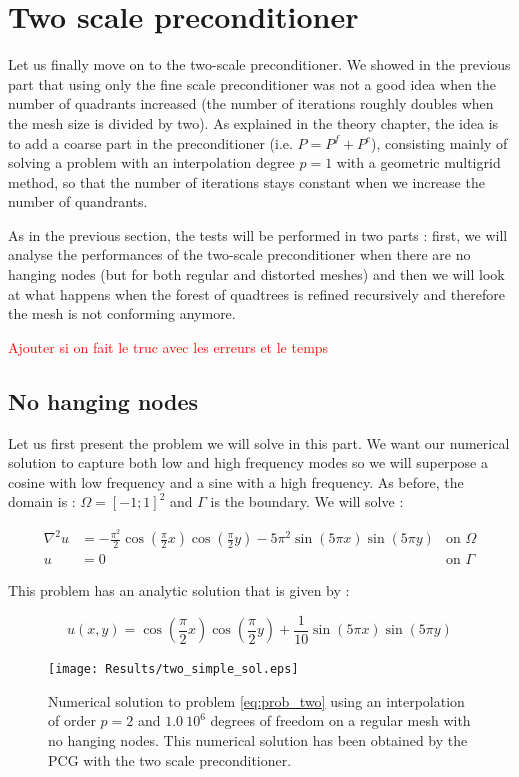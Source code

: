 \section{Two scale preconditioner}

Let us finally move on to the two-scale preconditioner. We showed in the previous part that using only the fine scale preconditioner was not a good idea when the number of quadrants increased (the number of iterations roughly doubles when the mesh size is divided by two). As explained in the theory chapter, the idea is to add a coarse part in the preconditioner (i.e. $P = P^f + P^c$), consisting mainly of solving a problem with an interpolation degree $p=1$ with a geometric multigrid method, so that the number of iterations stays constant when we increase the number of quandrants.  

As in the previous section, the tests will be performed in two parts : first, we will analyse the performances of the two-scale preconditioner when there are no hanging nodes (but for both regular and distorted meshes) and then we will look at what happens when the forest of quadtrees is refined recursively and therefore the mesh is not conforming anymore. 

\textcolor{red}{Ajouter si on fait le truc avec les erreurs et le temps}

\subsection{No hanging nodes}

Let us first present the problem we will solve in this part. We want our numerical solution to capture both low and high frequency modes so we will superpose a cosine with low frequency and a sine with a high frequency. As before, the domain is : $\Omega = \left[ -1;1 \right]^2$ and $\Gamma$ is the boundary. We will solve : 

\begin{align}
\nabla^2 u &= -\frac{\pi^2}{2}\cos(\frac{\pi}{2}x)\cos(\frac{\pi}{2}y) - 5\pi^2\sin(5\pi x)\sin(5\pi y) &\text{on $\Omega$} \label{eq:prob_two}\\
u &= 0  &\text{on $\Gamma$}
\end{align}

This problem has an analytic solution that is given by : 

$$ u(x,y) = \cos(\frac{\pi}{2}x)\cos(\frac{\pi}{2}y) + \frac{1}{10}\sin(5\pi x)\sin(5\pi y)$$

\begin{figure}
\centering
\texttt{[image: Results/two\_simple\_sol.eps]}
\caption{Numerical solution to problem \ref{eq:prob_two} using an interpolation of order $p=2$ and $1.0\:10^{6}$ degrees of freedom on a regular mesh with no hanging nodes. This numerical solution has been obtained by the PCG with the two scale preconditioner.}
\label{two_simple_sol}
\end{figure}


